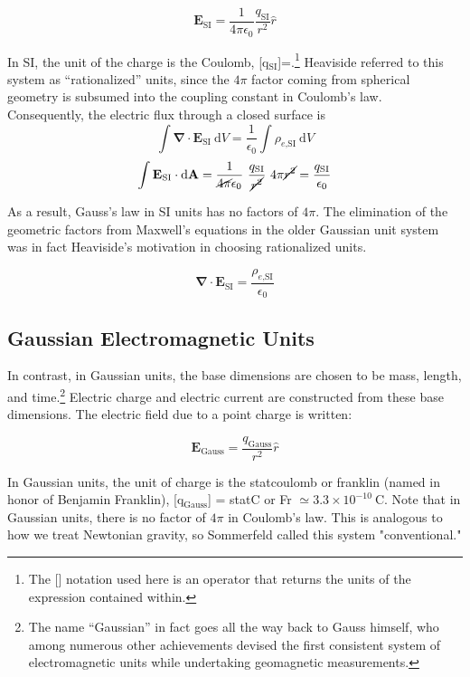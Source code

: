\documentclass[notoc]{tufte-handout}
\renewcommand{\vec}[1]{
\mathbf{#1}
}
\begin{document}
\[
\vec{E}_{\text{SI}} = \frac{1}{4\pi \epsilon_0} \frac{q_{\text{SI} } } {r^2}   \hat{r} 
\]

In SI, the unit of the charge is the Coulomb, [q$_{\text{SI} }$]=.\footnote {The [] notation used here is an operator that returns the units of the expression contained within.} Heaviside referred to this system as ``rationalized'' units, since the $4\pi$ factor coming from spherical geometry is subsumed into the coupling constant in Coulomb's law. Consequently, the electric flux through a closed surface is
\[
\int \vec{\nabla} \cdot \vec{E}_{\text{SI}}~\mathrm{d}V = \frac{1}{\epsilon_0} \int \rho_{e\text{,SI}}~\mathrm{d}V
\]
\[
\int \vec{E}_{\text{SI}}\cdot \mathrm{d}\vec{A} = \frac{1}{\cancel{4\pi}\epsilon_0}~\frac{q_{\text{SI}}}{\cancel{r^2}}~ 4\pi \cancel{r^2}  = \frac{q_{\text{SI}}}{\epsilon_0}
\]


As a result, Gauss's law in SI units has no factors of $4 \pi$. The elimination of the geometric factors from Maxwell's equations in the older Gaussian unit system was in fact Heaviside's motivation in choosing rationalized units.

\[
\vec{\nabla} \cdot \vec{E}_{\text{SI}} = \frac{\rho_{e\text{,SI}}}{\epsilon_0}
\]
\subsection {Gaussian Electromagnetic Units}

In contrast, in Gaussian units, the base dimensions are chosen to be mass, length, and time.\footnote {The name ``Gaussian'' in fact goes all the way back to Gauss himself, who among numerous other achievements devised the first consistent system of electromagnetic units while undertaking geomagnetic measurements.} Electric charge and electric current are constructed from these base dimensions.  The electric field due to a point charge is written:

\[
\vec{E}_{\text{Gauss}}  = \frac{q_{\text{Gauss}} }{r^2} \hat{r}
\]

In Gaussian units, the unit of charge is the statcoulomb or franklin (named in honor of Benjamin Franklin), [q$_{\text{Gauss}}$] = statC or Fr $\simeq 3.3\times 10^{-10}~\text{C}$. Note that in Gaussian units, there is no factor of $4\pi$ in Coulomb's law. This is analogous to how we treat Newtonian gravity, so Sommerfeld called this system "conventional." 
\end{document}
